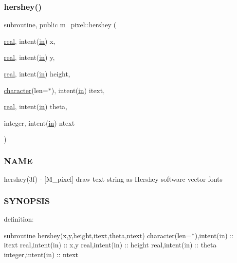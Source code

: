 \subsubsection{\texorpdfstring{hershey()}{hershey()}}
{\footnotesize\ttfamily \hyperlink{M__stopwatch_83_8txt_acfbcff50169d691ff02d4a123ed70482}{subroutine}, \hyperlink{M__stopwatch_83_8txt_a2f74811300c361e53b430611a7d1769f}{public} m\+\_\+pixel\+::hershey (\begin{DoxyParamCaption}\item[{\hyperlink{read__watch_83_8txt_abdb62bde002f38ef75f810d3a905a823}{real}, intent(\hyperlink{M__journal_83_8txt_afce72651d1eed785a2132bee863b2f38}{in})}]{x,  }\item[{\hyperlink{read__watch_83_8txt_abdb62bde002f38ef75f810d3a905a823}{real}, intent(\hyperlink{M__journal_83_8txt_afce72651d1eed785a2132bee863b2f38}{in})}]{y,  }\item[{\hyperlink{read__watch_83_8txt_abdb62bde002f38ef75f810d3a905a823}{real}, intent(\hyperlink{M__journal_83_8txt_afce72651d1eed785a2132bee863b2f38}{in})}]{height,  }\item[{\hyperlink{option__stopwatch_83_8txt_abd4b21fbbd175834027b5224bfe97e66}{character}(len=$\ast$), intent(\hyperlink{M__journal_83_8txt_afce72651d1eed785a2132bee863b2f38}{in})}]{itext,  }\item[{\hyperlink{read__watch_83_8txt_abdb62bde002f38ef75f810d3a905a823}{real}, intent(\hyperlink{M__journal_83_8txt_afce72651d1eed785a2132bee863b2f38}{in})}]{theta,  }\item[{integer, intent(\hyperlink{M__journal_83_8txt_afce72651d1eed785a2132bee863b2f38}{in})}]{ntext }\end{DoxyParamCaption})}



\subsubsection*{N\+A\+ME}

hershey(3f) -\/ \mbox{[}M\+\_\+pixel\mbox{]} draw text string as Hershey software vector fonts 

\subsubsection*{S\+Y\+N\+O\+P\+S\+IS}

definition\+:

subroutine hershey(x,y,height,itext,theta,ntext) character(len=$\ast$),intent(in) \+:\+: itext real,intent(in) \+:\+: x,y real,intent(in) \+:\+: height real,intent(in) \+:\+: theta integer,intent(in) \+:\+: ntext

